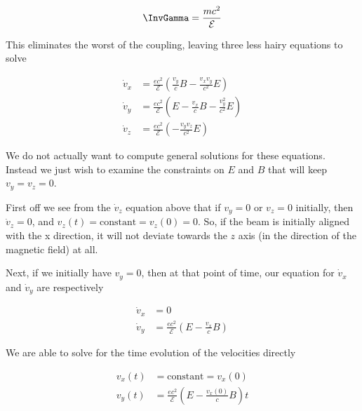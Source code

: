 {\begin{equation}\label{eqn:relElectroDynProblemSet2:330}
\InvGamma = \frac{ m c^2 }{\mathcal{E}}
\end{equation}

This eliminates the worst of the coupling, leaving three less hairy equations to solve

\begin{equation}\label{eqn:relElectroDynProblemSet2:350}
\begin{aligned}
\dot{v}_x &= \frac{e c^2}{\mathcal{E}} \left( \frac{v_y}{c} B - \frac{v_x v_y}{c^2} E \right) \\
\dot{v}_y &= \frac{e c^2}{\mathcal{E}} \left( E - \frac{v_x}{c} B - \frac{v_y^2}{c^2} E \right) \\
\dot{v}_z &= \frac{e c^2}{\mathcal{E}} \left( - \frac{v_y v_z}{c^2} E \right)
\end{aligned}
\end{equation}

We do not actually want to compute general solutions for these equations.  Instead we just wish to examine the constraints on $E$ and $B$ that will keep $v_y = v_z = 0$.

First off we see from the $\dot{v}_z$ equation above that if $v_y = 0$ or $v_z = 0$ initially, then $\dot{v}_z = 0$, and $v_z(t) = \text{constant} = v_z(0) = 0$.  So, if the beam is initially aligned with the x direction, it will not deviate towards the $z$ axis (in the direction of the magnetic field) at all.

Next, if we initially have $v_y = 0$, then at that point of time, our equation for $\dot{v}_x$ and $\dot{v}_y$ are respectively

\begin{equation}\label{eqn:relElectroDynProblemSet2:370}
\begin{aligned}
\dot{v}_x &= 0 \\
\dot{v}_y &= \frac{e c^2}{\mathcal{E}} \left( E - \frac{v_x}{c} B \right) 
\end{aligned}
\end{equation}

We are able to solve for the time evolution of the velocities directly

\begin{equation}\label{eqn:relElectroDynProblemSet2:390}
\begin{aligned}
v_x(t) &= \text{constant} = v_x(0) \\
v_y(t) &= \frac{e c^2}{\mathcal{E}} \left( E - \frac{v_x(0)}{c} B \right) t
\end{aligned}
\end{equation}

}
